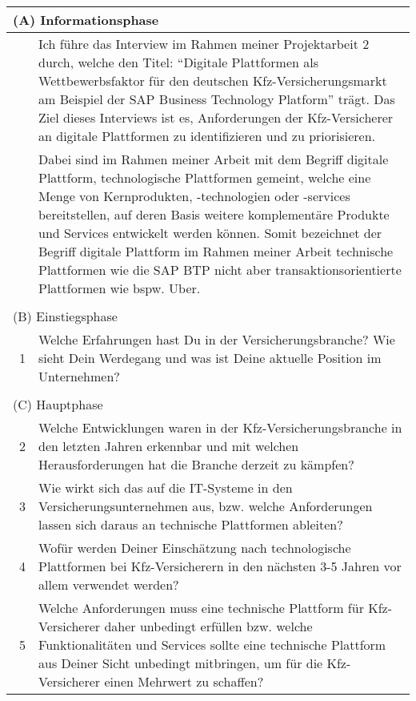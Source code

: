 \begin{table}[H]
\begin{tabularx}{\linewidth}{lX}
\multicolumn{2}{l}{(A) Informationsphase} \\\hline \hline 
    \    & Ich führe das Interview im Rahmen meiner Projektarbeit 2 durch, welche den Titel: \enquote{Digitale Plattformen als Wettbewerbsfaktor für den deutschen Kfz-Versicherungsmarkt am Beispiel der SAP Business Technology Platform} trägt. Das Ziel dieses Interviews ist es, Anforderungen der Kfz-Versicherer an digitale Plattformen zu identifizieren und zu priorisieren. \\\hline
    \    & Dabei sind im Rahmen meiner Arbeit mit dem Begriff digitale Plattform, technologische Plattformen gemeint, welche eine Menge von Kernprodukten, -technologien oder -services bereitstellen, auf deren Basis weitere komplementäre Produkte und Services entwickelt werden können. Somit bezeichnet der Begriff digitale Plattform im Rahmen meiner Arbeit technische Plattformen wie die SAP BTP nicht aber transaktionsorientierte Plattformen wie bspw. Uber.\\\hline
    \\     
\multicolumn{2}{l}{(B) Einstiegsphase}  \\\hline \hline
    \  1 & Welche Erfahrungen hast Du in der Versicherungsbranche? Wie sieht Dein Werdegang und was ist Deine aktuelle Position im Unternehmen? \\\hline     
    \\  
\multicolumn{2}{l}{(C) Hauptphase}  \\\hline \hline
    \  2 & Welche Entwicklungen waren in der Kfz-Versicherungsbranche in den letzten Jahren erkennbar und mit welchen Herausforderungen hat die Branche derzeit zu kämpfen?  \\\hline
    \  3 & Wie wirkt sich das auf die IT-Systeme in den Versicherungsunternehmen aus, bzw. welche Anforderungen lassen sich daraus an technische Plattformen ableiten? \\\hline
    \  4 & Wofür werden Deiner Einschätzung nach technologische Plattformen bei Kfz-Versicherern in den nächsten 3-5 Jahren vor allem verwendet werden? \\\hline
    \  5 & Welche Anforderungen muss eine technische Plattform für Kfz-Versicherer daher unbedingt erfüllen bzw. welche Funktionalitäten und Services sollte eine technische Plattform aus Deiner Sicht unbedingt mitbringen, um für die Kfz-Versicherer einen Mehrwert zu schaffen?  \\\hline
    
    \end{tabularx}
    \end{table} 
    \newpage


